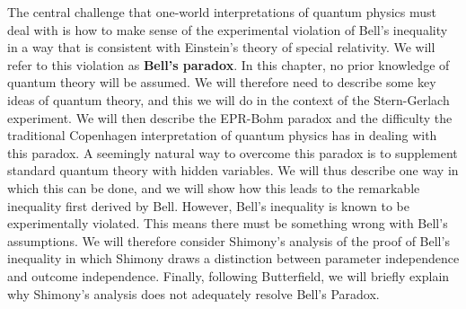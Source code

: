     The central challenge that one-world interpretations of quantum physics must deal with is how to make sense of the experimental violation of Bell's inequality in a way that is consistent with Einstein's theory of special relativity. We will refer to this violation as \textbf{Bell's paradox}. In this chapter, no  prior knowledge of quantum theory will be assumed. We will therefore need to describe some key ideas of quantum theory, and this we will do in the context of the  Stern-Gerlach experiment. 
    We will then describe the EPR-Bohm paradox and the difficulty the traditional Copenhagen interpretation of quantum physics has in dealing with this paradox. A seemingly natural way to overcome this paradox is to supplement standard quantum theory with hidden variables. We will thus describe one way in which this can be done, and we will show how this leads to the remarkable inequality first derived by Bell. However, Bell's inequality is known to be experimentally violated. This means there must be something wrong with Bell's assumptions. We will therefore consider Shimony's analysis of the proof of Bell's inequality in which Shimony draws a distinction between parameter independence and outcome independence. Finally, following Butterfield, we will briefly explain why Shimony's analysis does not adequately resolve Bell's Paradox. 


    